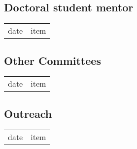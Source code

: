 \subsection{Doctoral student mentor}
\begin{tabular}[l]{ p{} p{} }
date & item\\
\end{tabular} 

\subsection{Other Committees}
\begin{tabular}[l]{ p{} p{} }
date & item\\
\end{tabular} 


\subsection{Outreach}
\begin{tabular}[l]{ p{} p{} }
date & item\\
\end{tabular} 